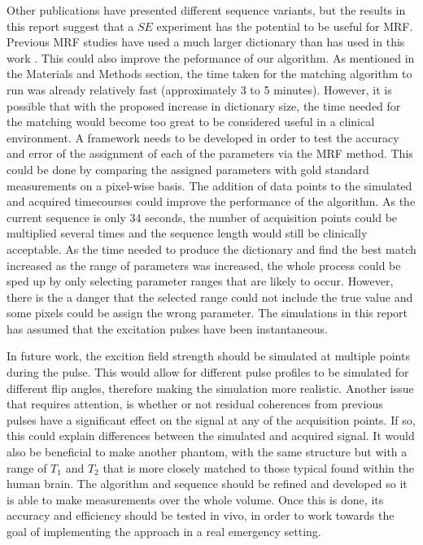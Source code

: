 \documentclass[journal]{IEEEtran}
\begin{document}
Other publications have presented different sequence variants, but the results in this report suggest that a $SE$ experiment has the potential to be useful for MRF. Previous MRF studies have used a much larger dictionary than has used in this work \cite{ma2013magnetic} \cite{MRM:MRM25799}. This could also improve the peformance of our algorithm. As mentioned in the Materials and Methods section, the time taken for the matching algorithm to run was already relatively fast (approximately 3 to 5 minutes). However, it is possible that with the proposed increase in dictionary size, the time needed for the matching would become too great to be considered useful in a clinical environment. A framework needs to be developed in order to test the accuracy and error of the assignment of each of the parameters via the MRF method. This could be done by comparing the assigned parameters with gold standard measurements on a pixel-wise basis. The addition of data points to the simulated and acquired timecourses could improve the performance of the algorithm. As the current sequence is only 34 seconds, the number of acquisition points could be multiplied several times and the sequence length would still be clinically acceptable. As the time needed to produce the dictionary and find the best match increased as the range of parameters was increased, the whole process could be sped up by only selecting parameter ranges that are likely to occur. However, there is the a danger that the selected range could not include the true value and some pixels could be assign the wrong parameter.
The simulations in this report has assumed that the excitation pulses have been instantaneous.

In future work, the excition field strength should be simulated at multiple points during the pulse. This would allow for different pulse profiles to be simulated for different flip angles, therefore making the simulation more realistic. Another issue that requires attention, is whether or not residual coherences from previous pulses have a significant effect on the signal at any of the acquisition points. If so, this could explain differences between the simulated and acquired signal. It would also be beneficial to make another phantom, with the same structure but with a range of $T_{1}$ and $T_{2}$ that is more closely matched to those typical found within the human brain. The algorithm and sequence should be refined and developed so it is able to make measurements over the whole volume. Once this is done, its accuracy and efficiency should be tested in vivo, in order to work towards the goal of implementing the approach in a real emergency setting.
\end{document}
